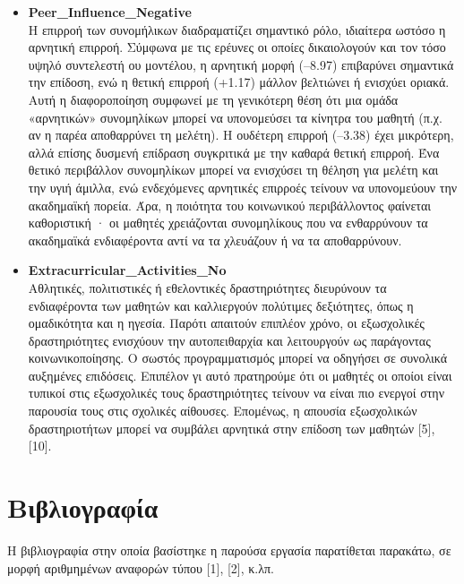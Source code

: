\documentclass[12pt]{article}
\begin{document}
\begin{itemize}
\item \textbf{Peer\_{Influence}\_{Negative}}\\
Η επιρροή των συνομήλικων διαδραματίζει σημαντικό ρόλο, ιδιαίτερα ωστόσο η αρνητική επιρροή. Σύμφωνα με τις ερέυνες οι οποίες δικαιολογούν και τον τόσο υψηλό συντελεστή ου μοντέλου, η αρνητική μορφή (–8.97) 
επιβαρύνει σημαντικά την επίδοση, ενώ η θετική επιρροή (+1.17) μάλλον βελτιώνει ή ενισχύει οριακά. Αυτή η διαφοροποίηση συμφωνεί με τη γενικότερη θέση ότι μια ομάδα «αρνητικών» συνομηλίκων μπορεί να υπονομεύσει
τα κίνητρα του μαθητή (π.χ. αν η παρέα αποθαρρύνει τη μελέτη). Η ουδέτερη επιρροή (–3.38) έχει μικρότερη, αλλά επίσης δυσμενή επίδραση συγκριτικά με την καθαρά θετική επιρροή. Ένα θετικό περιβάλλον συνομηλίκων 
μπορεί να ενισχύσει τη θέληση για μελέτη και την υγιή άμιλλα, ενώ ενδεχόμενες αρνητικές επιρροές τείνουν να υπονομεύουν την ακαδημαϊκή πορεία. Άρα, η ποιότητα του κοινωνικού περιβάλλοντος φαίνεται καθοριστική
· οι μαθητές χρειάζονται συνομηλίκους που να ενθαρρύνουν τα ακαδημαϊκά ενδιαφέροντα αντί να τα χλευάζουν ή να τα αποθαρρύνουν.
\item \textbf{Extracurricular\_{Activities}\_{No}}\\  
Αθλητικές, πολιτιστικές ή εθελοντικές δραστηριότητες διευρύνουν τα ενδιαφέροντα των μαθητών και καλλιεργούν πολύτιμες δεξιότητες, όπως η ομαδικότητα και η ηγεσία. Παρότι απαιτούν επιπλέον χρόνο, οι εξωσχολικές 
δραστηριότητες ενισχύουν την αυτοπειθαρχία και λειτουργούν ως παράγοντας κοινωνικοποίησης. Ο σωστός προγραμματισμός μπορεί να οδηγήσει σε συνολικά αυξημένες επιδόσεις. Επιπέλον γι αυτό πρατηρούμε ότι οι μαθητές οι οποίοι 
είναι τυπικοί στις εξωσχολικές τους δραστηριότητες τείνουν να είναι πιο ενεργοί στην παρουσία τους στις σχολικές αίθουσες. Επομένως, η απουσία εξωσχολικών δραστηριοτήτων μπορεί να συμβάλει αρνητικά στην επίδοση των μαθητών [5], [10].

\end{itemize}

\newpage
\section{Βιβλιογραφία}

Η βιβλιογραφία στην οποία βασίστηκε η παρούσα εργασία παρατίθεται παρακάτω, σε μορφή αριθμημένων αναφορών τύπου [1], [2], κ.λπ. \\
\end{document}
